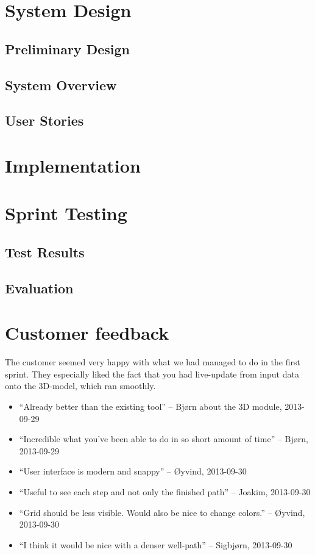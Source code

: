 \documentclass{report}
\begin{document}
\section{System Design} \label{sec:system:_design}
\subsection{Preliminary Design} \label{subsec:prelim_design}
\subsection{System Overview} \label{subsec:sys_overview}
\subsection{User Stories} \label{subsec:user_stories}
\section{Implementation} \label{sec:implementation}
\section{Sprint Testing} \label{sec:sprint_testing}
\subsection{Test Results} \label{subsec:test_results}
\subsection{Evaluation} \label{subsec:evaluation}
\section{Customer feedback} \label{sec:cust_feed}
The customer seemed very happy with what we had managed to do in the first sprint. They especially liked the fact that you had live-update from input data onto the 3D-model, which ran smoothly.
\begin{itemize}
\item “Already better than the existing tool” – Bjørn about the 3D module, 2013-09-29
\item “Incredible what you’ve been able to do in so short amount of time” – Bjørn, 2013-09-29
\item “User interface is modern and snappy” – Øyvind, 2013-09-30
\item “Useful to see each step and not only the finished path”  – Joakim, 2013-09-30
\item “Grid should be less visible. Would also be nice to change colors.” – Øyvind, 2013-09-30 
\item “I think it would be nice with a denser well-path” – Sigbjørn, 2013-09-30
\end{itemize}
\end{document}
